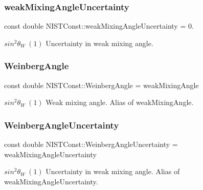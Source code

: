 \subsubsection{\texorpdfstring{weak\+Mixing\+Angle\+Uncertainty}{weakMixingAngleUncertainty}}
{\footnotesize\ttfamily const double N\+I\+S\+T\+Const\+::weak\+Mixing\+Angle\+Uncertainty = 0.}

$sin^2 \theta_W \ (1)$ Uncertainty in weak mixing angle. \mbox{\label{group___weak_mixing_angle_gaa27d3628b9e064d9d8d998be81b6adf0}} 
\subsubsection{\texorpdfstring{Weinberg\+Angle}{WeinbergAngle}}
{\footnotesize\ttfamily const double N\+I\+S\+T\+Const\+::\+Weinberg\+Angle = weak\+Mixing\+Angle}

$sin^2 \theta_W \ (1)$ Weak mixing angle. Alias of weak\+Mixing\+Angle. \mbox{\label{group___weak_mixing_angle_ga923e5bc037fee920767800b7cc9ad724}} 
\subsubsection{\texorpdfstring{Weinberg\+Angle\+Uncertainty}{WeinbergAngleUncertainty}}
{\footnotesize\ttfamily const double N\+I\+S\+T\+Const\+::\+Weinberg\+Angle\+Uncertainty = weak\+Mixing\+Angle\+Uncertainty}

$sin^2 \theta_W \ (1)$ Uncertainty in weak mixing angle. Alias of weak\+Mixing\+Angle\+Uncertainty. 